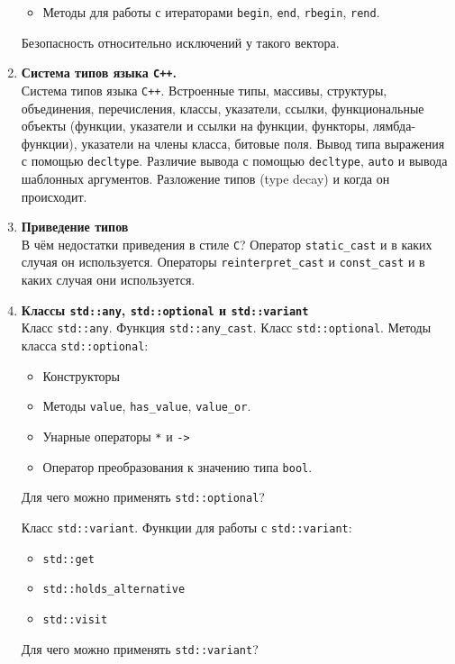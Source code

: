 \documentclass{article}
\begin{document}
\begin{enumerate}
\begin{itemize}
\item Методы для работы с итераторами \texttt{begin}, \texttt{end}, \texttt{rbegin}, \texttt{rend}.
\end{itemize}

Безопасность относительно исключений у такого вектора.




\item \textbf{Система типов языка \texttt{C++}.}\\
Система типов языка \texttt{C++}. Встроенные типы, массивы, структуры, объединения, перечисления, классы, указатели, ссылки, функциональные объекты (функции, указатели и ссылки на функции, функторы, лямбда-функции), указатели на члены класса, битовые поля. Вывод типа выражения с помощью \texttt{decltype}. Различие вывода с помощью \texttt{decltype}, \texttt{auto} и вывода шаблонных аргументов. Разложение типов (type decay) и когда он происходит.


\item \textbf{Приведение типов}\\
В чём недостатки приведения в стиле \texttt{C}? Оператор \texttt{static\_cast} и в каких случая он используется. Операторы \texttt{reinterpret\_cast} и \texttt{const\_cast} и в каких случая они используется. 

\item \textbf{Классы \texttt{std::any}, \texttt{std::optional} и \texttt{std::variant}}\\
Класс \texttt{std::any}. Функция \texttt{std::any\_cast}. Класс \texttt{std::optional}. Методы класса \texttt{std::optional}:
\begin{itemize}
\item Конструкторы
\item Методы \texttt{value}, \texttt{has\_value}, \texttt{value\_or}.
\item Унарные операторы \texttt{*} и \texttt{->}
\item Оператор преобразования к значению типа \texttt{bool}.
\end{itemize}
Для чего можно применять \texttt{std::optional}?

Класс \texttt{std::variant}. Функции для работы с \texttt{std::variant}:
\begin{itemize}
\item \texttt{std::get}
\item \texttt{std::holds\_alternative}
\item \texttt{std::visit}
\end{itemize}
Для чего можно применять \texttt{std::variant}?



\end{enumerate}
\end{document}
